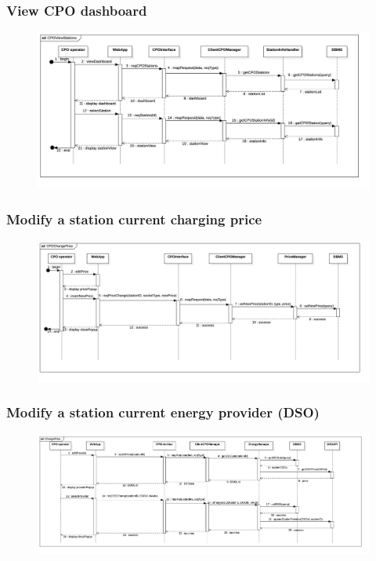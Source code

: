 \subsubsection{View CPO dashboard}
\begin{figure}[H]
    \begin{center}
        \includegraphics[width=\textwidth]{img/runtime/cpo_dashboard}
    \end{center}
\end{figure}
\subsubsection{Modify a station current charging price}
\begin{figure}[H]
    \begin{center}
        \includegraphics[width=\textwidth]{img/runtime/cpo_price}
    \end{center}
\end{figure}
\subsubsection{Modify a station current energy provider (DSO)}
\begin{figure}[H]
    \begin{center}
        \includegraphics[width=\textwidth]{img/runtime/cpo_dso}
    \end{center}
\end{figure}
